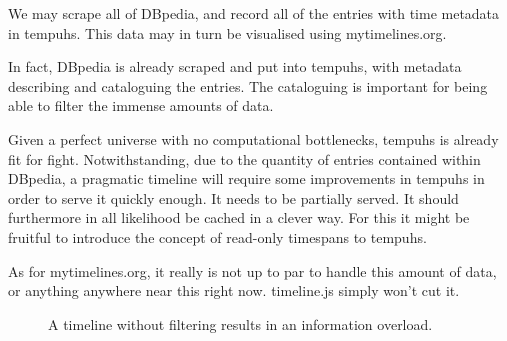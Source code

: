We may scrape all of DBpedia, and record all of the entries with time metadata 
in tempuhs. This data may in turn be visualised using mytimelines.org.

In fact, DBpedia is already scraped and put into tempuhs, with metadata 
describing and cataloguing the entries. The cataloguing is important for being
able to filter the immense amounts of data.

Given a perfect universe with no computational bottlenecks, tempuhs is already 
fit for fight. Notwithstanding, due to the quantity of entries contained 
within DBpedia, a pragmatic timeline will require some improvements in tempuhs 
in order to serve it quickly enough. It needs to be partially served. It 
should furthermore in all likelihood be cached in a clever way. For this it 
might be fruitful to introduce the concept of read-only timespans to tempuhs.

As for mytimelines.org, it really is not up to par to handle this amount of 
data, or anything anywhere near this right now. timeline.js simply won't cut 
it.

\begin{figure*}
  \centering
  \begin{scale}{0.7}
    
  \end{scale}
  \caption{A timeline without filtering results in an information overload.}
  \label{fig:overload}
\end{figure*}
